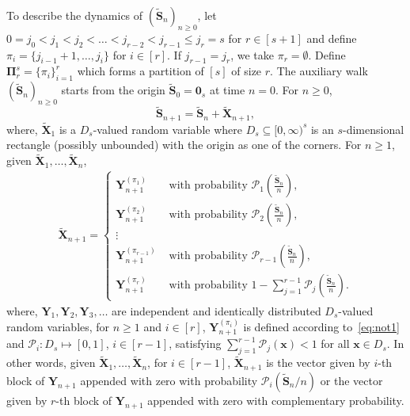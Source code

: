 \documentclass[12pt]{amsart}
\theoremstyle{plain}
\theoremstyle{remark}
\numberwithin{equation}{section}
\begin{document}
To describe the dynamics of $(\boldsymbol{\widetilde{S}}_n)_{n\geq0}$, let $0 = j_0 < j_1 < j_2 < \ldots < j_{r-2} < j_{r-1} \leq j_r = s$ for $r \in [s+1]$ and define $\pi_i = \{j_{i-1}+1, \ldots, j_i\}$ for $i \in [r]$. If $j_{r-1} = j_r$, we take $\pi_r = \emptyset$. Define  $\boldsymbol{\Pi}^s_r = \{\pi_i\}_{i = 1}^r$ which forms a partition of $[s]$ of size $r$. %
The auxiliary walk $(\boldsymbol{\widetilde{S}}_n)_{n\geq0}$ starts from the origin $\boldsymbol{\widetilde{S}}_0 = \boldsymbol{0}_s$ at time $n = 0$. For $n \geq 0$,
\[
    \boldsymbol{\widetilde{S}}_{n+1} = \boldsymbol{\widetilde{S}}_{n} + \boldsymbol{\widetilde{X}}_{n+1},
\]
where, $\boldsymbol{\widetilde{X}}_{1}$ is a $D_s$-valued random variable where $D_s \subseteq [0,\infty)^s$ is an $s$-dimensional rectangle (possibly unbounded) with the origin as one of the corners.
For $n \geq 1$, given $\boldsymbol{\widetilde{X}}_1, \ldots, \boldsymbol{\widetilde{X}}_{n}$, 
\begin{align}\label{eq12}
           \boldsymbol{\widetilde{X}}_{n+1} = \begin{cases}
               \boldsymbol{Y}^{({\pi}_1)}_{n+1} &\text{ with probability }   \mathcal{P}_1\left(\frac{\boldsymbol{\widetilde{S}}_n}{n}\right), \\ \boldsymbol{Y}^{({\pi}_2)}_{n+1} &\text{ with probability }   \mathcal{P}_2\left(\frac{\boldsymbol{\widetilde{S}}_n}{n}\right), \\ \vdots \\ \boldsymbol{Y}^{({\pi}_{r-1})}_{n+1} &\text{ with probability }   \mathcal{P}_{r-1}\left(\frac{\boldsymbol{\widetilde{S}}_n}{n}\right), \\ 
               \boldsymbol{Y}^{({\pi}_r)}_{n+1} &\text{ with probability } 1-\sum_{j=1}^{r-1}\mathcal{P}_j\left(\frac{\boldsymbol{\widetilde{S}}_n}{n}\right).
           \end{cases}
\end{align}
where, $\boldsymbol{Y}_1, \boldsymbol{Y}_2, \boldsymbol{Y}_3, \ldots$ are independent and identically distributed $D_s$-valued random variables, for $n \geq 1$ and $i \in [r]$, $\boldsymbol{Y}^{(\pi_i)}_{n+1}$ is defined according to~\eqref{eq:not1} and $\mathcal{P}_i: D_s \mapsto [0,1]$, $i \in [r-1]$, satisfying $\sum_{j=1}^{r-1}\mathcal{P}_j(\boldsymbol{x}) < 1$ for all $\boldsymbol{x} \in D_s$. In other words, given $\boldsymbol{\widetilde{X}}_1, \ldots, \boldsymbol{\widetilde{X}}_{n}$, for $i \in [r-1]$, $\boldsymbol{\widetilde{X}}_{n+1}$ is the vector given by $i$-th block of $\boldsymbol{Y}_{n+1}$ appended with zero with probability $\mathcal{P}_i(\boldsymbol{\widetilde{S}}_n/n)$ or the vector given by $r$-th block of $\boldsymbol{Y}_{n+1}$ appended with zero with complementary probability.
\end{document}
